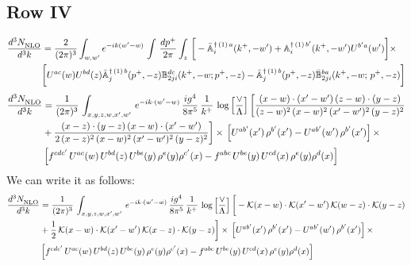 \documentclass[9pt]{article}
\def\mf#1{\mathbb{#1}}
\numberwithin{equation}{section}
\begin{document}
\subsection{Row IV}
\begin{align}
 \frac{d^{3}N_{\rm NLO}^{\rm}}{d^{3}k}  & = \frac{2}{(2\pi)^{3}}  \int_{w, w^\prime} e^{-ik(w^\prime-w)}\, \int\,\frac{dp^{+}}{2\pi} \int_{z}\,\bigg[-\bar{\mf{A}}^{\dagger\,(1)\,a}_{i}(k^{+},-w^{\prime})+\mf{A}^{\dagger\, (1)\, b^{\prime}}_{i}(k^{+},-w^{\prime})U^{b^{\prime}a}(w^{\prime})\bigg]\times \notag \\ & \bigg[U^{ac}(w)U^{bd}(z) \bar{\mf{A}}^{\dagger\, (1)\, b}_{j}(p^+,- z) {\mf{B}}^{dc}_{2ji} (k^+, -w;p^+, -z) - \Bar{\mf{A}}^{\dagger\, (1)\, b}_{j}(p^{+}, -z)\Bar{\mf{B}}^{ba}_{2ji}(k^{+},-w;\,p^{+}, -z) \bigg] \nonumber
\end{align}
\begin{align}
    \frac{d^{3}N_{\rm NLO}^{\rm}}{d^{3}k}  & =  \frac{1}{(2\pi)^{3}}\,
    \int_{x,y,z,w,x',w'}\,e^{-ik\cdot (w^\prime-w)}\, \frac{ig^{4}}{8\pi^{5}}\,\frac{1}{k^{+}}\,\log{\left[\frac{\vee}{\Lambda}\right]}\,\bigg[\frac{(x-w)\cdot (x'-w')\,(z-w)\cdot (y-z)}{(z-w)^{2}\,(x-w)^{2}\,(x'-w')^{2}\,(y-z)^{2}}\notag \\ & +\frac{(x-z)\cdot (y-z)\,(x-w)\cdot (x'-w')}{2\, (x-z)^{2}\,(x-w)^{2}\,(x'-w')^{2}\,(y-z)^{2}}\bigg]\times\,\left[U^{ab'}(x')\,\rho^{b'}(x')-U^{ab'}(w')\,\rho^{b'}(x')\right]\times\notag \\ &  \left[f^{cdc'}\,U^{ac}(w)\,U^{bd}(z)\,U^{be}(y)\,\rho^{e}(y)\rho^{c'}(x)-f^{abc}\,U^{be}(y)\,U^{cd}(x)\,\rho^{e}(y)\rho^{d}(x)\right]
\end{align}
We can write it as follows:
\begin{align}
    \frac{d^{3}N_{\rm NLO}^{\rm}}{d^{3}k}  & =  \frac{1}{(2\pi)^{3}}\,
    \int_{x,y,z,w,x',w'}\,e^{-ik\cdot (w^\prime-w)}\, \frac{ig^{4}}{8\pi^{5}}\,\frac{1}{k^{+}}\,\log{\left[\frac{\vee}{\Lambda}\right]}\,\bigg[-\mathcal{K}(x-w)\cdot \mathcal{K}(x'-w')\, \mathcal{K}(w-z)\cdot \mathcal{K}(y-z)\notag \\ & +\frac{1}{2}\,\mathcal{K}(x-w)\cdot \mathcal{K}(x'-w')\, \mathcal{K}(x-z)\cdot \mathcal{K}(y-z)\bigg]\times\,\left[U^{ab'}(x')\,\rho^{b'}(x')-U^{ab'}(w')\,\rho^{b'}(x')\right]\times\notag \\ &  \left[f^{cdc'}\,U^{ac}(w)\,U^{bd}(z)\,U^{be}(y)\,\rho^{e}(y)\rho^{c'}(x)-f^{abc}\,U^{be}(y)\,U^{cd}(x)\,\rho^{e}(y)\rho^{d}(x)\right]
\end{align}
\end{document}
